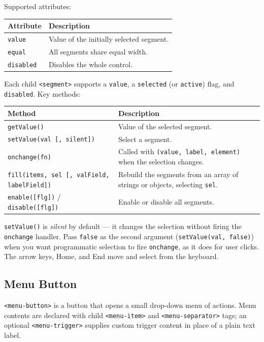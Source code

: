 \noindent
Supported attributes:

\begin{longtable}{P{3.8cm}P{6.7cm}}
\toprule
\textbf{Attribute} & \textbf{Description} \\
\midrule
\endhead
\texttt{value} & Value of the initially selected segment. \\
\texttt{equal} & All segments share equal width. \\
\texttt{disabled} & Disables the whole control. \\
\bottomrule
\end{longtable}

\noindent
Each child \texttt{<segment>} supports a \texttt{value}, a \texttt{selected} (or \texttt{active}) flag, and \texttt{disabled}.  Key methods:

\begin{longtable}{P{4.8cm}P{5.7cm}}
\toprule
\textbf{Method} & \textbf{Description} \\
\midrule
\endhead
\texttt{getValue()} & Value of the selected segment. \\
\texttt{setValue(val [, silent])} & Select a segment. \\
\texttt{onchange(fn)} & Called with \texttt{(value, label, element)} when the selection changes. \\
\texttt{fill(items, sel [, valField, labelField])} & Rebuild the segments from an array of strings or objects, selecting \texttt{sel}. \\
\texttt{enable([flg])} / \texttt{disable([flg])} & Enable or disable all segments. \\
\bottomrule
\end{longtable}

\begin{notebox}
\texttt{setValue()} is \emph{silent} by default --- it changes the selection without firing the \texttt{onchange} handler.  Pass \texttt{false} as the second argument (\texttt{setValue(val, false)}) when you want programmatic selection to fire \texttt{onchange}, as it does for user clicks.  The arrow keys, Home, and End move and select from the keyboard.
\end{notebox}

\subsection{Menu Button}
\label{sec:comp-menu-button}

\texttt{<menu-button>} is a button that opens a small drop-down menu of actions.  Menu contents are declared with child \texttt{<menu-item>} and \texttt{<menu-separator>} tags; an optional \texttt{<menu-trigger>} supplies custom trigger content in place of a plain text label.

